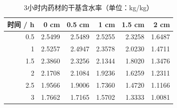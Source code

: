 \begin{table}[htbp]
\caption{3小时内药材的干基含水率（单位：kg/kg）}\label{tab:required-4}
\centering
\small
\begin{tabular}{rrrrrr}
\toprule
时间 / h & 0 cm & 0.5 cm & 1 cm & 1.5 cm & 2 cm \\
\midrule
0.5 & 2.5499 & 2.5489 & 2.5255 & 2.3258 & 1.6487 \\
1 & 2.5257 & 2.4947 & 2.3578 & 2.0230 & 1.4711 \\
1.5 & 2.3860 & 2.3256 & 2.1344 & 1.8020 & 1.3476 \\
2 & 2.1708 & 2.1084 & 1.9236 & 1.6259 & 1.2311 \\
2.5 & 1.9566 & 1.9006 & 1.7360 & 1.4720 & 1.1166 \\
3 & 1.7662 & 1.7165 & 1.5702 & 1.3333 & 1.0081 \\
\bottomrule
\end{tabular}
\end{table}
